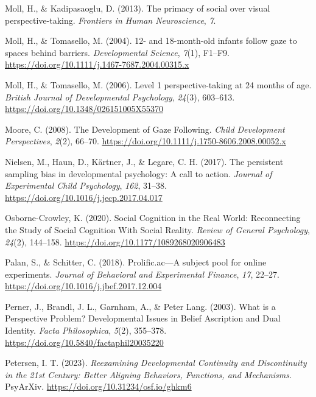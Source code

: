 \documentclass[
  man,mask,floatsintext]{apa7}
\newlength{\cslhangindent}
\newlength{\cslentryspacingunit} %
\newenvironment{CSLReferences}[2] %
 {%
  \setlength{\parindent}{0pt}
  \ifodd #1
  \let\oldpar\par
  \def\par{\hangindent=\cslhangindent\oldpar}
  \fi
  \setlength{\parskip}{#2\cslentryspacingunit}
 }%
 {}
\begin{document}
\begin{CSLReferences}{1}{0}
\leavevmode{}%
Moll, H., \& Kadipasaoglu, D. (2013). The primacy of social over visual perspective-taking. \emph{Frontiers in Human Neuroscience}, \emph{7}.

\leavevmode{}%
Moll, H., \& Tomasello, M. (2004). 12- and 18-month-old infants follow gaze to spaces behind barriers. \emph{Developmental Science}, \emph{7}(1), F1--F9. \url{https://doi.org/10.1111/j.1467-7687.2004.00315.x}

\leavevmode{}%
Moll, H., \& Tomasello, M. (2006). Level 1 perspective-taking at 24 months of age. \emph{British Journal of Developmental Psychology}, \emph{24}(3), 603--613. \url{https://doi.org/10.1348/026151005X55370}

\leavevmode{}%
Moore, C. (2008). The {Development} of {Gaze Following}. \emph{Child Development Perspectives}, \emph{2}(2), 66--70. \url{https://doi.org/10.1111/j.1750-8606.2008.00052.x}

\leavevmode{}%
Nielsen, M., Haun, D., Kärtner, J., \& Legare, C. H. (2017). The persistent sampling bias in developmental psychology: {A} call to action. \emph{Journal of Experimental Child Psychology}, \emph{162}, 31--38. \url{https://doi.org/10.1016/j.jecp.2017.04.017}

\leavevmode{}%
Osborne-Crowley, K. (2020). Social {Cognition} in the {Real World}: {Reconnecting} the {Study} of {Social Cognition With Social Reality}. \emph{Review of General Psychology}, \emph{24}(2), 144--158. \url{https://doi.org/10.1177/1089268020906483}

\leavevmode{}%
Palan, S., \& Schitter, C. (2018). Prolific.ac---{A} subject pool for online experiments. \emph{Journal of Behavioral and Experimental Finance}, \emph{17}, 22--27. \url{https://doi.org/10.1016/j.jbef.2017.12.004}

\leavevmode{}%
Perner, J., Brandl, J. L., Garnham, A., \& Peter Lang. (2003). What is a {Perspective Problem}? {Developmental Issues} in {Belief Ascription} and {Dual Identity}. \emph{Facta Philosophica}, \emph{5}(2), 355--378. \url{https://doi.org/10.5840/factaphil20035220}

\leavevmode{}%
Petersen, I. T. (2023). \emph{Reexamining {Developmental Continuity} and {Discontinuity} in the 21st {Century}: {Better Aligning Behaviors}, {Functions}, and {Mechanisms}}. PsyArXiv. \url{https://doi.org/10.31234/osf.io/ghkm6}


\end{CSLReferences}
\end{document}
